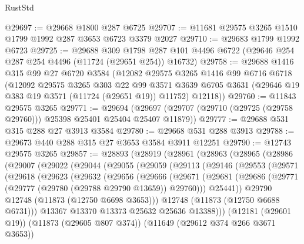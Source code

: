 \begin{lexlean}{RustStd}
\begin{coremodule}
@29697 := @29668 @1800 @287 @6725
@29707 := @11681 @29575 @3265 @1510 @1799 @1992 @287 @3653 @6723 @3379 @2027
@29710 := @29683 @1799 @1992 @6723
@29725 := @29688
    @309
    @1798
    @287
    @101
    @4496
    @6722
    (@29646 @254 @287 @254 @4496 (@11724 (@29651 @254)) @16732)
@29758 := @29688
    @1416
    @315
    @99
    @27
    @6720
    @3584
    (@12082
      @29575
      @3265
      @1416
      @99
      @6716
      @6718
      (@12092
        @29575
        @3265
        @303
        @22
        @99
        @3571
        @3639
        @6705
        @3631
        (@29646 @19 @383 @19 @3571 (@11724 (@29651 @19)) @11752)
        @12118))
@29760 := @11843 @29575 @3265
@29771 := @29694
    (@29697 (@29707 (@29710 (@29725 (@29758 @29760))) @25398 @25401 @25404 @25407 @11879))
@29777 := @29688 @531 @315 @288 @27 @3913 @3584
@29780 := @29668 @531 @288 @3913
@29788 := @29673 @440 @288 @315 @27 @3653 @3584 @3911 @12251
@29790 := @12743 @29575 @3265
@29857 := @28893
    (@28919
      (@28961
        (@28963
          (@28965
            (@28986
              (@29007
                (@29022
                  (@29044
                    (@29055
                      (@29059
                        (@29113
                          (@29146
                            (@29553
                              (@29571
                                (@29618
                                  (@29623
                                    (@29632
                                      (@29656
                                        (@29666
                                          (@29671
                                            (@29681
                                              (@29686
                                                (@29771
                                                  (@29777 (@29780 (@29788 @29790 @13659)) @29760)))
                                              @25441))
                                          @29790
                                          @12748
                                          (@11873 (@12750 @6698 @3653)))
                                        @12748
                                        (@11873 (@12750 @6688 @6731)))
                                      @13367
                                      @13370
                                      @13373
                                      @25632
                                      @25636
                                      @13388)))
                                (@12181 (@29601 @19))
                                (@11873 (@29605 @807 @374))
                                (@11649 (@29612 @374 @266 @3671 @3653))

\end{coremodule}
\end{lexlean}

